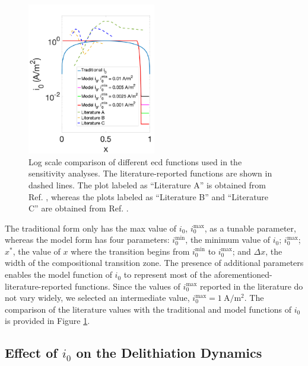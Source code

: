 \documentclass{article}
\begin{document}
\begin{figure}
  \begin{center}
    \includegraphics[width=0.5\textwidth]{i0_sensitivity.pdf}
  \end{center}
  \caption{Log scale comparison of different \gls{ecd} functions used
    in the sensitivity analyses. The literature-reported functions are
    shown in dashed lines.  The plot labeled as ``Literature A'' is
    obtained from Ref. \cite{dees2008}, whereas the plots labeled
    as ``Literature B'' and ``Literature C'' are obtained from
    Ref. \cite{tsai2018}.}
  \label{fig:i0_profiles}
\end{figure}

The traditional form only has the max value of $i_0$,
$i_0^{\mathrm{max}}$, as a tunable parameter, whereas the model form
has four parameters: $i_0^{\mathrm{min}}$, the minimum value of
$i_0$; $i_0^{\mathrm{max}}$; $x^{\ast }$, the value of $x$ where the
transition begins from $i_0^{\mathrm{min}}$ to $i_0^{\mathrm{max}}$;
and $\Delta x$, the width of the compositional transition zone. The presence of additional
parameters enables the model function of $i_0$ to represent most of
the aforementioned-literature-reported functions. Since the values of
$i_0^{\mathrm{max}}$ reported in the %
literature \cite{tsai2018,dees2008} do not vary widely, we selected
an intermediate value,
$i_0^{\mathrm{max}}=\SI{1}{\ampere\per\meter\squared}$. The comparison
of the literature values with the traditional and model functions of
$i_0$ is provided in Figure \ref{fig:i0_profiles}.

\subsection{Effect of $i_0$ on the Delithiation Dynamics}
\end{document}
